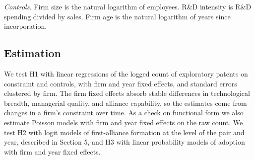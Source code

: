 \documentclass[12pt]{article}
\begin{document}
\textit{Controls.} Firm size is the natural logarithm of employees. R\&D intensity is R\&D spending divided by sales. Firm age is the natural logarithm of years since incorporation.

\subsection{Estimation}

We test H1 with linear regressions of the logged count of exploratory patents on constraint and controls, with firm and year fixed effects, and standard errors clustered by firm. The firm fixed effects absorb stable differences in technological breadth, managerial quality, and alliance capability, so the estimates come from changes in a firm's constraint over time. As a check on functional form we also estimate Poisson models with firm and year fixed effects on the raw count. We test H2 with logit models of first-alliance formation at the level of the pair and year, described in Section 5, and H3 with linear probability models of adoption with firm and year fixed effects.
\end{document}
